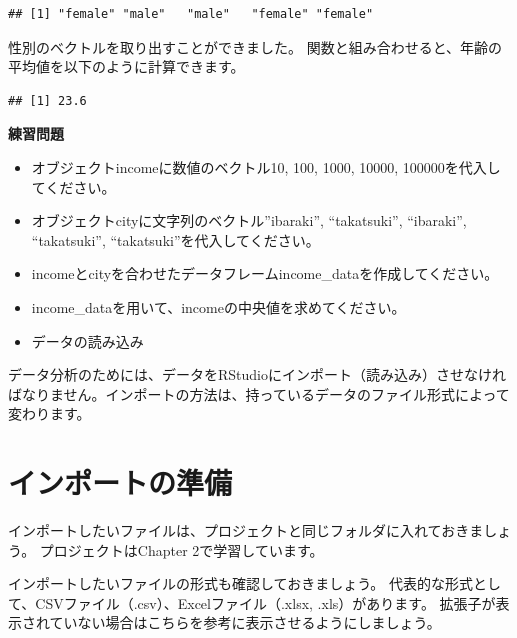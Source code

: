 \documentclass[
]{book}
\newenvironment{Shaded}{\begin{snugshade}}{\end{snugshade}}
\newcommand{\FunctionTok}[1]{\textcolor[rgb]{0.00,0.00,0.00}{#1}}
\newcommand{\NormalTok}[1]{#1}
\newcommand{\SpecialCharTok}[1]{\textcolor[rgb]{0.00,0.00,0.00}{#1}}
\begin{document}
\begin{verbatim}
## [1] "female" "male"   "male"   "female" "female"
\end{verbatim}

性別のベクトルを取り出すことができました。 関数と組み合わせると、年齢の平均値を以下のように計算できます。

\begin{Shaded}
\end{Shaded}

\begin{verbatim}
## [1] 23.6
\end{verbatim}

\textbf{練習問題}

\begin{itemize}
\item
  オブジェクトincomeに数値のベクトル10, 100, 1000, 10000, 100000を代入してください。\\
\item
  オブジェクトcityに文字列のベクトル''ibaraki'', ``takatsuki'', ``ibaraki'', ``takatsuki'', ``takatsuki''を代入してください。\\
\item
  incomeとcityを合わせたデータフレームincome\_dataを作成してください。\\
\item
  income\_dataを用いて、incomeの中央値を求めてください。
\item
  データの読み込み
\end{itemize}

データ分析のためには、データをRStudioにインポート（読み込み）させなければなりません。インポートの方法は、持っているデータのファイル形式によって変わります。

\hypertarget{ux30a4ux30f3ux30ddux30fcux30c8ux306eux6e96ux5099}{%
\section{インポートの準備}\label{ux30a4ux30f3ux30ddux30fcux30c8ux306eux6e96ux5099}}

インポートしたいファイルは、プロジェクトと同じフォルダに入れておきましょう。 プロジェクトはChapter 2で学習しています。

インポートしたいファイルの形式も確認しておきましょう。 代表的な形式として、CSVファイル（.csv）、Excelファイル（.xlsx, .xls）があります。 拡張子が表示されていない場合はこちらを参考に表示させるようにしましょう。
\end{document}
